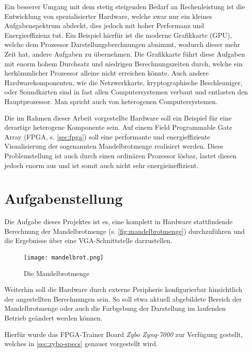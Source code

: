 \documentclass[a4paper,12pt,onesided]{report}
\begin{document}
Ein besserer Umgang mit dem stetig steigenden Bedarf an Rechenleistung ist die Entwicklung von spezialisierter Hardware, welche zwar nur ein kleines Aufgabenspektrum abdeckt, dies jedoch mit hoher Performanz und Energieeffizienz tut.
Ein Beispiel hierfür ist die moderne Grafikkarte (GPU), welche dem Prozessor Darstellungsberchnungen abnimmt, wodurch dieser mehr Zeit hat, andere Aufgaben zu übernehmen. Die Grafikkarte führt diese Aufgaben mit enorm hohem Durchsatz und niedrigen Berechnungszeiten durch, welche ein herkömmlicher Prozessor alleine nicht erreichen könnte.
Auch andere Hardwarekomponenten, wie die Netzwerkkarte, kryptographische Beschleuniger, oder Soundkarten sind in fast allen Computersystemen verbaut und entlasten den Hauptprozessor. Man spricht auch von heterogenen Computersystemen.

Die im Rahmen dieser Arbeit vorgestellte Hardware soll ein Beispiel für eine derartige heterogene Komponente sein. Auf einem Field Programmable Gate Array (FPGA, s. \autoref{sec:fpga}) soll eine performante und energieffiziente Visualisierung der sogenannten Mandelbrotmenge realisiert werden.
Diese Problemstellung ist auch durch einen ordinären Prozessor lösbar, lastet diesen jedoch enorm aus und ist somit auch nicht sehr energieineffizient.

\section{Aufgabenstellung}
\label{sec:aufgabenstellung}
Die Aufgabe dieses Projektes ist es, eine komplett in Hardware stattfindende Berechnung der Mandelbrotmenge (s. \autoref{fig:mandelbrotmenge}) durchzuführen und die Ergebnisse über eine VGA-Schnittstelle darzustellen.

\begin{figure}[H]
	\centering
	\texttt{[image: mandelbrot.png]}
	\caption{Die Mandelbrotmenge}
	\label{fig:mandelbrotmenge}
\end{figure}

Weiterhin soll die Hardware durch externe Peripherie konfigurierbar hinsichtlich der angestellten Berechnungen sein.
So soll etwa aktuell abgebildete Bereich der Mandelbrotmenge oder auch die Farbgebung der Darstellung im laufenden Betrieb geändert werden können.

Hierfür wurde das FPGA-Trainer Board \textit{Zybo Zynq-7000} zur Verfügung gestellt, welches in \autoref{sec:zybo-specs} genauer vorgestellt wird.
\end{document}
